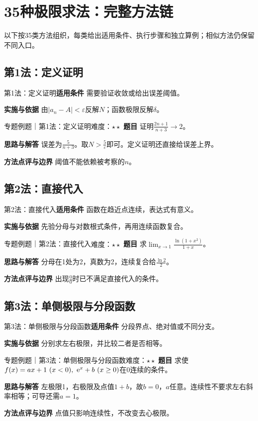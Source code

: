 \section{35种极限求法：完整方法链}\label{mat:limits_35}
\begin{examtip}以下按35类方法组织，每类给出适用条件、执行步骤和独立算例；相似方法仍保留不同入口。\end{examtip}
\subsection{第1法：定义证明}\label{mat:limits_35:k01}
\begin{method}{第1法：定义证明}\textbf{适用条件} 需要验证收敛或给出误差阈值。\par\textbf{实施与依据} 由$|a_n-A|<\varepsilon$反解$N$；函数极限反解$\delta$。\end{method}
\begin{example}{专题例题｜第1法：定义证明}{难度：$\star\star$}
\textbf{题目} 证明$\frac{2n+1}{n+3}\to2$。\par\textbf{思路与解答} 误差为$\frac{5}{n+3}$。取$N>\frac{5}{\varepsilon}$即可。定义证明还直接给误差上界。\par\textbf{方法点评与边界} 阈值不能依赖被考察的$n$。
\end{example}
\subsection{第2法：直接代入}\label{mat:limits_35:k02}
\begin{method}{第2法：直接代入}\textbf{适用条件} 函数在趋近点连续，表达式有意义。\par\textbf{实施与依据} 先验分母与对数根式条件，再用连续函数复合。\end{method}
\begin{example}{专题例题｜第2法：直接代入}{难度：$\star\star$}
\textbf{题目} 求$\lim_{x\to1}\frac{\ln(1+x^2)}{1+x}$。\par\textbf{思路与解答} 分母在1处为2，真数为2，连续复合给$\frac{\ln2}{2}$。\par\textbf{方法点评与边界} 出现$\frac{0}{0}$时已不满足直接代入的条件。
\end{example}
\subsection{第3法：单侧极限与分段函数}\label{mat:limits_35:k03}
\begin{method}{第3法：单侧极限与分段函数}\textbf{适用条件} 分段界点、绝对值或不同分支。\par\textbf{实施与依据} 分别求左右极限，并比较二者是否相等。\end{method}
\begin{example}{专题例题｜第3法：单侧极限与分段函数}{难度：$\star\star$}
\textbf{题目} 求使$f(x)=ax+1\ (x<0),\ \e^x+b\ (x\ge0)$在0连续的条件。\par\textbf{思路与解答} 左极限1，右极限及点值$1+b$，故$b=0$，$a$任意。连续性不要求左右斜率相等；可导还需$a=1$。\par\textbf{方法点评与边界} 点值只影响连续性，不改变去心极限。
\end{example}
